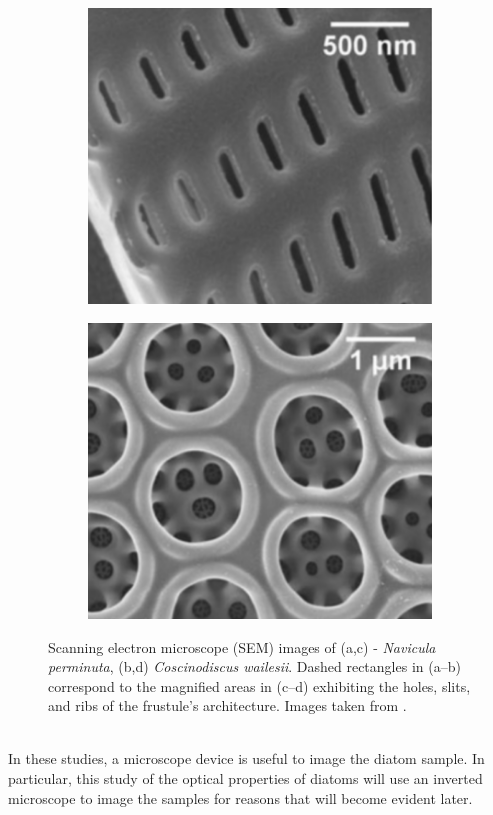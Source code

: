 \documentclass[letterpaper,12pt,oneside]{book}
\begin{document}
\begin{figure}[H]
\begin{subfigure}[b]{0.5\linewidth}
    \includegraphics[width=0.75\linewidth]{Frustrulespictures/Screen Shot 2023-07-02 at 8.25.17 PM.png} 
    \subcaption[]{}
    \label{fig7:c} 
  \end{subfigure}%
  \begin{subfigure}[b]{0.5\linewidth}
    \centering
    \includegraphics[width=0.75\linewidth]{Frustrulespictures/Screen Shot 2023-07-02 at 8.25.43 PM.png} 
    \subcaption[]{}
    \label{fig7:d} 
  \end{subfigure} 
  \caption{Scanning electron microscope (SEM) images of (a,c) - \emph{Navicula perminuta}, (b,d) \emph{Coscinodiscus wailesii}. Dashed rectangles in (a–b) correspond to the
magnified areas in (c–d) exhibiting the holes, slits, and ribs of the frustule's architecture. Images taken from \cite{aguirre2018diatomDNAViolet}.}
  \label{poresfrustrules} 
\end{figure}

\\In these studies, a microscope device is useful to image the diatom sample. In particular, this study of the optical properties of diatoms will use an inverted microscope to image the samples for reasons that will become evident later.
\end{document}
